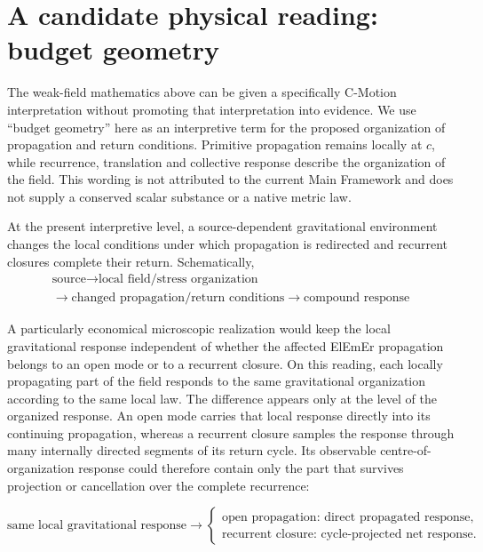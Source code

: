 \documentclass[11pt]{article}
\newcommand{\cmotion}{\mbox{C-Motion}}
\theoremstyle{plain}
\theoremstyle{remark}
\begin{document}
\section{A candidate physical reading: budget geometry}
\label{sec:budget}

The weak-field mathematics above can be given a specifically \cmotion{} interpretation
without promoting that interpretation into evidence.  We use ``budget geometry''
here as an interpretive term for the proposed organization of propagation and
return conditions.  Primitive propagation remains locally at $c$, while
recurrence, translation and collective response describe the organization of
the field.  This wording is not attributed to the current Main Framework and
does not supply a conserved scalar substance or a native metric law.

At the present interpretive level, a source-dependent gravitational environment changes
the local conditions under which propagation is redirected and recurrent closures
complete their return.  Schematically,
\begin{equation}
\boxed{
\begin{gathered}
\text{source}
\longrightarrow
\text{local field/stress organization}\\
\longrightarrow
\text{changed propagation/return conditions}
\longrightarrow
\text{compound response}
\end{gathered}}
\end{equation}

A particularly economical microscopic realization would keep the local gravitational
response independent of whether the affected ElEmEr propagation belongs to an open mode
or to a recurrent closure.  On this reading, each locally propagating part of the field
responds to the same gravitational organization according to the same local law.  The
difference appears only at the level of the organized response.  An open mode carries
that local response directly into its continuing propagation, whereas a recurrent
closure samples the response through many internally directed segments of its return
cycle.  Its observable centre-of-organization response could therefore contain only the
part that survives projection or cancellation over the complete recurrence:

\[
\boxed{
  \text{same local gravitational response}
  \longrightarrow
  \begin{cases}
    \text{open propagation: direct propagated response},\\[2pt]
    \text{recurrent closure: cycle-projected net response}.
\end{cases}}
\]
\end{document}

